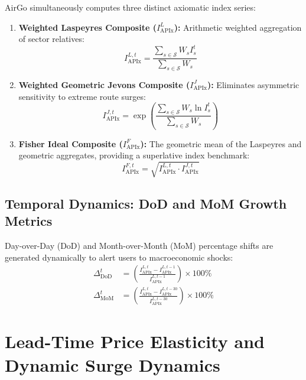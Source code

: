 \documentclass[11pt,a4paper]{article}
\begin{document}
AirGo simultaneously computes three distinct axiomatic index series:
\begin{enumerate}
    \item \textbf{Weighted Laspeyres Composite ($I_{\text{APIx}}^L$):} Arithmetic weighted aggregation of sector relatives:
    \begin{equation}
    \label{eq:laspeyres}
    I_{\text{APIx}}^{L, t} = \frac{\sum_{s \in \mathcal{S}} W_s I_s^t}{\sum_{s \in \mathcal{S}} W_s}
    \end{equation}

    \item \textbf{Weighted Geometric Jevons Composite ($I_{\text{APIx}}^J$):} Eliminates asymmetric sensitivity to extreme route surges:
    \begin{equation}
    \label{eq:geometric_jevons}
    I_{\text{APIx}}^{J, t} = \exp\left( \frac{\sum_{s \in \mathcal{S}} W_s \ln I_s^t}{\sum_{s \in \mathcal{S}} W_s} \right)
    \end{equation}

    \item \textbf{Fisher Ideal Composite ($I_{\text{APIx}}^F$):} The geometric mean of the Laspeyres and geometric aggregates, providing a superlative index benchmark:
    \begin{equation}
    \label{eq:fisher}
    I_{\text{APIx}}^{F, t} = \sqrt{I_{\text{APIx}}^{L, t} \cdot I_{\text{APIx}}^{J, t}}
    \end{equation}
\end{enumerate}

\subsection{Temporal Dynamics: DoD and MoM Growth Metrics}
Day-over-Day (DoD) and Month-over-Month (MoM) percentage shifts are generated dynamically to alert users to macroeconomic shocks:
\begin{align}
\Delta_{\text{DoD}}^t &= \left( \frac{I_{\text{APIx}}^{L, t} - I_{\text{APIx}}^{L, t-1}}{I_{\text{APIx}}^{L, t-1}} \right) \times 100\% \\
\Delta_{\text{MoM}}^t &= \left( \frac{I_{\text{APIx}}^{L, t} - I_{\text{APIx}}^{L, t-30}}{I_{\text{APIx}}^{L, t-30}} \right) \times 100\%
\end{align}

\section{Lead-Time Price Elasticity and Dynamic Surge Dynamics}
\label{sec:elasticity}
\end{document}
